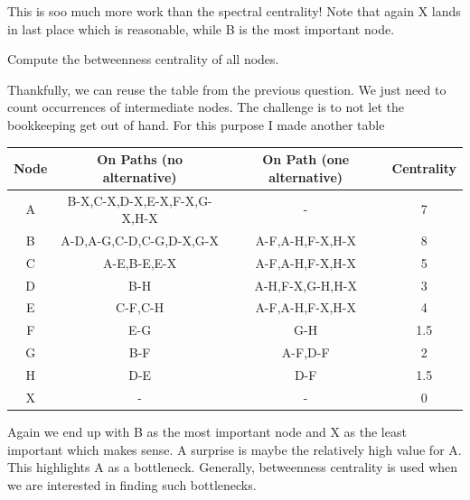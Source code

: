 This is soo much more work than the spectral centrality! Note that again X lands in last place which is reasonable, while B is the most important node. 


\subquestion
Compute the betweenness centrality of all nodes.

\solution
Thankfully, we can reuse the table from the previous question. We just need to count occurrences of intermediate nodes. The challenge is to not let the bookkeeping get out of hand. For this purpose I made another table

\begin{center}
\begin{tabular}{c c c c}
Node & On Paths (no alternative) & On Path (one alternative) & Centrality \\\hline
A & B-X,C-X,D-X,E-X,F-X,G-X,H-X & - & 7 \\
B & A-D,A-G,C-D,C-G,D-X,G-X & A-F,A-H,F-X,H-X & 8 \\
C & A-E,B-E,E-X & A-F,A-H,F-X,H-X & 5 \\
D & B-H & A-H,F-X,G-H,H-X & 3 \\
E & C-F,C-H & A-F,A-H,F-X,H-X & 4 \\
F & E-G & G-H & 1.5 \\
G & B-F & A-F,D-F & 2   \\
H & D-E & D-F & 1.5 \\
X & - & - & 0 \\  
\end{tabular}
\end{center}
Again we end up with B as the most important node and X as the least important which makes sense. A surprise is maybe the relatively high value for A. This highlights A as a bottleneck. Generally, betweenness centrality is used when we are interested in finding such bottlenecks. 

